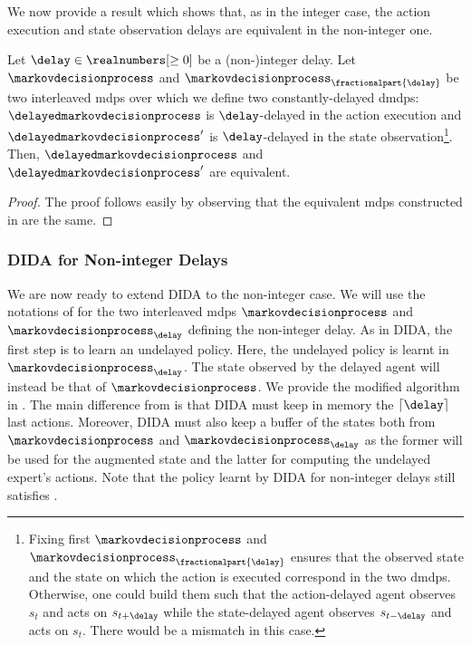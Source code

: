 We now provide a result which shows that, as in the integer case, the action execution and state observation delays are equivalent in the non-integer one. 
\begin{prop}
    Let $\delay\in\realnumbers[\ge0]$ be a (non-)integer delay.
    Let $\markovdecisionprocess$ and $\markovdecisionprocess_{\fractionalpart{\delay}}$ be two interleaved \glspl{mdp} over which we define two constantly-delayed \glspl{dmdp}: $\delayedmarkovdecisionprocess$ is $\delay$-delayed in the action execution and $\delayedmarkovdecisionprocess'$ is $\delay$-delayed in the state observation\footnote{Fixing first $\markovdecisionprocess$ and $\markovdecisionprocess_{\fractionalpart{\delay}}$ ensures that the observed state and the state on which the action is executed correspond in the two \glspl{dmdp}. 
    Otherwise, one could build them such that the action-delayed agent observes $s_t$ and acts on $s_{t+\delay}$ while the state-delayed agent observes $s_{t-\delay}$ and acts on $s_{t}$. There would be a mismatch in this case.}. 
    Then, $\delayedmarkovdecisionprocess$ and $\delayedmarkovdecisionprocess'$ are equivalent.
\end{prop}
\begin{proof}
    The proof follows easily by observing that the equivalent \glspl{mdp} constructed in  are the same.
\end{proof}


\subsubsection{DIDA for Non-integer Delays}
\label{subsubsec:dida_non_int}

We are now ready to extend DIDA to the non-integer case. We will use the notations of  for the two interleaved \glspl{mdp} $\markovdecisionprocess$ and $\markovdecisionprocess_\delay$ defining the non-integer delay. 
As in DIDA, the first step is to learn an undelayed policy. Here, the undelayed policy is learnt in $\markovdecisionprocess_\delay$.
The state observed by the delayed agent will instead be that of $\markovdecisionprocess$.
We provide the modified algorithm in .
The main difference from  is that DIDA must keep in memory the $\lceil\delay\rceil$ last actions. 
Moreover, DIDA must also keep a buffer of the states both from  $\markovdecisionprocess$ and $\markovdecisionprocess_\delay$ as the former will be used for the augmented state and the latter for computing the undelayed expert's actions.
Note that the policy learnt by DIDA for non-integer delays still satisfies .


